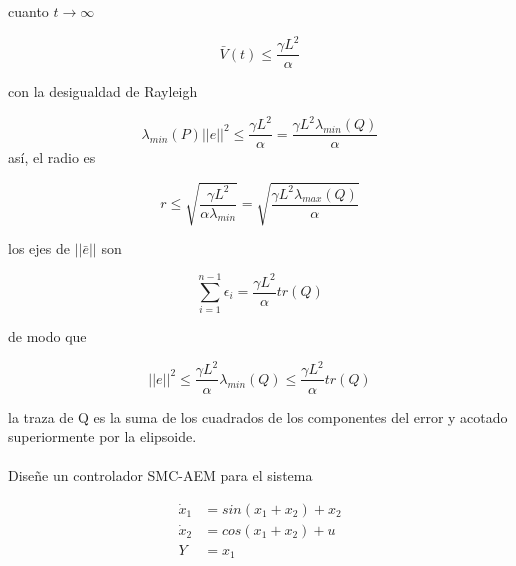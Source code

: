 cuanto $t\to \infty$

\begin{equation*}
    \bar{V}(t) \leq \frac{\gamma L^2}{\alpha}
\end{equation*}

con la desigualdad de Rayleigh

\begin{equation*}
    \lambda_{min}(P)||e||^2 \leq \frac{\gamma L^2}{\alpha} = \frac{\gamma L^2 \lambda_{min}(Q)}{\alpha}
\end{equation*}
así, el radio es 

\begin{equation*}
    r \leq \sqrt{\frac{\gamma L^2}{\alpha \lambda_{min}}}= \sqrt{\frac{\gamma L^2 \lambda_{max}(Q)}{\alpha}}
\end{equation*}

los ejes de $||\bar{e}||$ son

\begin{equation*}
    \sum_{i=1}^{n-1} \epsilon_i = \frac{\gamma L^2}{\alpha} tr (Q)
\end{equation*}

de modo que

\begin{equation*}
    ||e||^2 \leq \frac{\gamma L^2}{\alpha} \lambda_{min}(Q) \leq \frac{\gamma L^2}{\alpha} tr(Q)
\end{equation*}

la traza de Q es la suma de los cuadrados de los componentes del error y acotado superiormente por la elipsoide.

 \paragraph{} Diseñe un controlador SMC-AEM para el sistema 

\begin{equation*}
    \begin{aligned}
        \dot{x}_1&=sin(x_1+x_2)+x_2\\
        \dot{x}_2&=cos(x_1+x_2)+u\\
        Y&=x_1\\
    \end{aligned}
\end{equation*}

